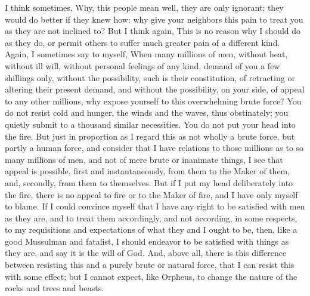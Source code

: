\documentclass[12pt]{article}
\begin{document}
I think sometimes, Why, this people mean well, they are only ignorant;
they would do better if they knew how: why give your neighbors this pain
to treat you as they are not inclined to? But I think again, This is no
reason why I should do as they do, or permit others to suffer much
greater pain of a different kind. Again, I sometimes say to myself, When
many millions of men, without heat, without ill will, without personal
feelings of any kind, demand of you a few shillings only, without the
possibility, such is their constitution, of retracting or altering their
present demand, and without the possibility, on your side, of appeal to
any other millions, why expose yourself to this overwhelming brute
force? You do not resist cold and hunger, the winds and the waves, thus
obstinately; you quietly submit to a thousand similar necessities. You
do not put your head into the fire. But just in proportion as I regard
this as not wholly a brute force, but partly a human force, and consider
that I have relations to those millions as to so many millions of men,
and not of mere brute or inanimate things, I see that appeal is
possible, first and instantaneously, from them to the Maker of them,
and, secondly, from them to themselves. But if I put my head
deliberately into the fire, there is no appeal to fire or to the Maker
of fire, and I have only myself to blame. If I could convince myself
that I have any right to be satisfied with men as they are, and to treat
them accordingly, and not according, in some respects, to my
requisitions and expectations of what they and I ought to be, then, like
a good Mussulman and fatalist, I should endeavor to be satisfied with
things as they are, and say it is the will of God. And, above all, there
is this difference between resisting this and a purely brute or natural
force, that I can resist this with some effect; but I cannot expect,
like Orpheus, to change the nature of the rocks and trees and beasts.
\end{document}
